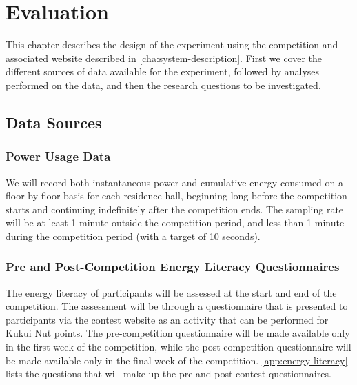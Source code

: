 \chapter{Evaluation}

This chapter describes the design of the experiment using the competition and associated website described in \autoref{cha:system-description}. First we cover the different sources of data available for the experiment, followed by analyses performed on the data, and then the research questions to be investigated. 

\section{Data Sources}

\subsection{Power Usage Data}
\label{sec:power-usage-data}

We will record both instantaneous power and cumulative energy consumed on a floor by floor basis for each residence hall, beginning long before the competition starts and continuing indefinitely after the competition ends. The sampling rate will be at least 1 minute outside the competition period, and less than 1 minute during the competition period (with a target of 10 seconds).

\subsection{Pre and Post-Competition Energy Literacy Questionnaires}
\label{sec:exp-literacy-questionnaire}

The energy literacy of participants will be assessed at the start and end of the competition. The assessment will be through a questionnaire that is presented to participants via the contest website as an activity that can be performed for Kukui Nut points. The pre-competition questionnaire will be made available only in the first week of the competition, while the post-competition questionnaire will be made available only in the final week of the competition. \autoref{app:energy-literacy} lists the questions that will make up the pre and post-contest questionnaires.

